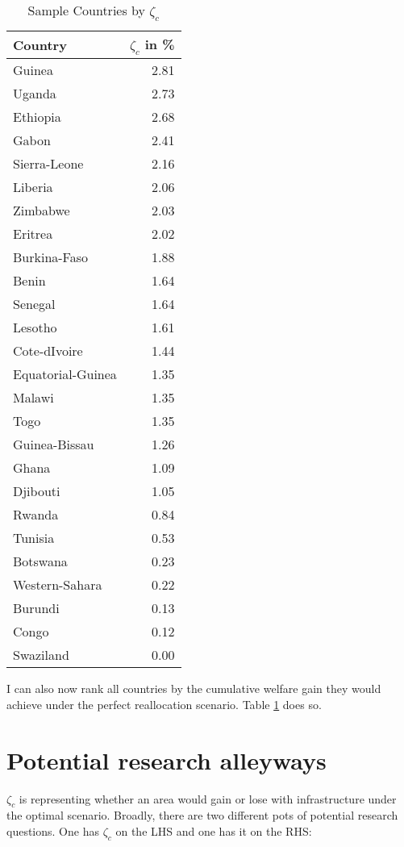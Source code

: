 \documentclass[11pt, oneside]{article}   	%
\begin{document}
\begin{table}[ht]
\centering
\caption{Sample Countries by $\zeta_{c}$}
\begin{tabular}{lr}
  \hline
Country & $\zeta_{c}$ in \% \\
  \hline
  Guinea & 2.81 \\
    Uganda & 2.73 \\
    Ethiopia & 2.68 \\
    Gabon & 2.41 \\
    Sierra-Leone & 2.16 \\
    Liberia & 2.06 \\
    Zimbabwe & 2.03 \\
    Eritrea & 2.02 \\
    Burkina-Faso & 1.88 \\
    Benin & 1.64 \\
    Senegal & 1.64 \\
    Lesotho & 1.61 \\
    Cote-dIvoire & 1.44 \\
    Equatorial-Guinea & 1.35 \\
    Malawi & 1.35 \\
    Togo & 1.35 \\
    Guinea-Bissau & 1.26 \\
    Ghana & 1.09 \\
    Djibouti & 1.05 \\
    Rwanda & 0.84 \\
    Tunisia & 0.53 \\
    Botswana & 0.23 \\
    Western-Sahara & 0.22 \\
    Burundi & 0.13 \\
    Congo & 0.12 \\
    Swaziland & 0.00 \\
     \hline
  \end{tabular}
  \label{tab:national_zeta}
  \end{table}




I can also now rank all countries by the cumulative welfare gain they would achieve under the perfect reallocation scenario. Table \ref{tab:national_zeta} does so.

\section{Potential research alleyways}
$\zeta_{c}$ is representing whether an area would gain or lose with infrastructure under the optimal scenario. Broadly, there are two different pots of potential research questions. One has $\zeta_{c}$ on the LHS and one has it on the RHS:
\end{document}

